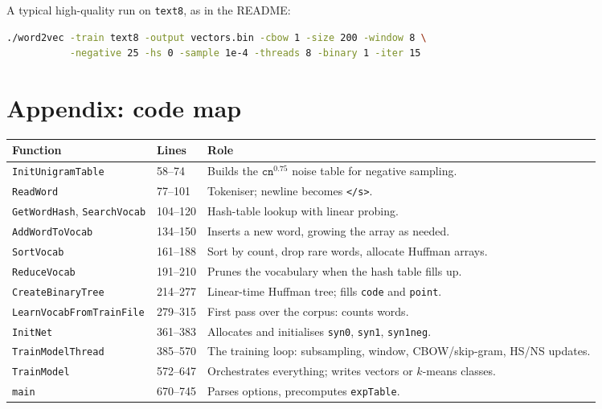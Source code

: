 \documentclass[11pt,a4paper]{article}
\newcommand{\code}[1]{\texttt{#1}}
\begin{document}
A typical high-quality run on \code{text8}, as in the README:
\begin{lstlisting}[language=bash,numbers=none,morekeywords={}]
./word2vec -train text8 -output vectors.bin -cbow 1 -size 200 -window 8 \
           -negative 25 -hs 0 -sample 1e-4 -threads 8 -binary 1 -iter 15
\end{lstlisting}

\section*{Appendix: code map}

\begin{center}
\small
\begin{tabularx}{\linewidth}{@{}llX@{}}
\toprule
Function & Lines & Role \\
\midrule
\code{InitUnigramTable} & 58--74 & Builds the $\code{cn}^{0.75}$ noise table for negative sampling. \\
\code{ReadWord} & 77--101 & Tokeniser; newline becomes \code{</s>}. \\
\code{GetWordHash}, \code{SearchVocab} & 104--120 & Hash-table lookup with linear probing. \\
\code{AddWordToVocab} & 134--150 & Inserts a new word, growing the array as needed. \\
\code{SortVocab} & 161--188 & Sort by count, drop rare words, allocate Huffman arrays. \\
\code{ReduceVocab} & 191--210 & Prunes the vocabulary when the hash table fills up. \\
\code{CreateBinaryTree} & 214--277 & Linear-time Huffman tree; fills \code{code} and \code{point}. \\
\code{LearnVocabFromTrainFile} & 279--315 & First pass over the corpus: counts words. \\
\code{InitNet} & 361--383 & Allocates and initialises \code{syn0}, \code{syn1}, \code{syn1neg}. \\
\code{TrainModelThread} & 385--570 & The training loop: subsampling, window, CBOW/skip-gram, HS/NS updates. \\
\code{TrainModel} & 572--647 & Orchestrates everything; writes vectors or $k$-means classes. \\
\code{main} & 670--745 & Parses options, precomputes \code{expTable}. \\
\bottomrule
\end{tabularx}
\end{center}
\end{document}
